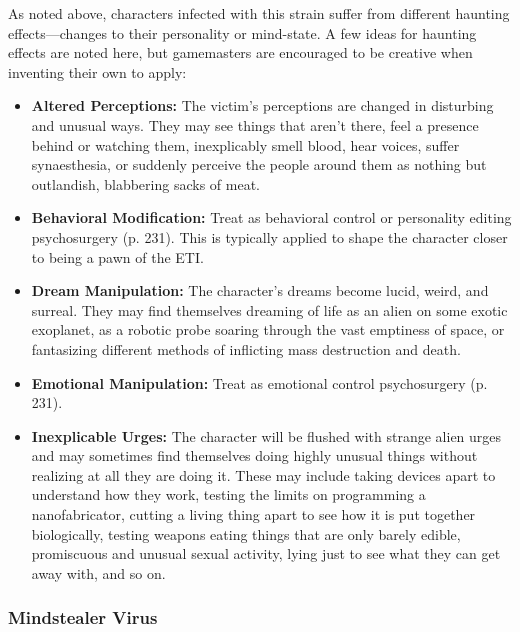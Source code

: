 As noted above, characters infected with this strain suffer from different haunting effects—changes to their personality or mind-state. A few ideas for haunting effects are noted here, but gamemasters are encouraged to be creative when inventing their own to apply: 

\begin{itemize} \item \textbf{Altered Perceptions:} The victim's perceptions are changed in disturbing and unusual ways. They may see things that aren't there, feel a presence behind or watching them, inexplicably smell blood, hear voices, suffer synaesthesia, or suddenly perceive the people around them as nothing but outlandish, blabbering sacks of meat. \item \textbf{Behavioral Modification:} Treat as behavioral control or personality editing psychosurgery (p. 231). This is typically applied to shape the character closer to being a pawn of the ETI. \item \textbf{Dream Manipulation:} The character's dreams become lucid, weird, and surreal. They may find themselves dreaming of life as an alien on some exotic exoplanet, as a robotic probe soaring through the vast emptiness of space, or fantasizing different methods of inflicting mass destruction and death. \item \textbf{Emotional Manipulation:} Treat as emotional control psychosurgery (p. 231). \item \textbf{Inexplicable Urges:} The character will be flushed with strange alien urges and may sometimes find themselves doing highly unusual things without realizing at all they are doing it. These may include taking devices apart to understand how they work, testing the limits on programming a nanofabricator, cutting a living thing apart to see how it is put together biologically, testing weapons eating things that are only barely edible, promiscuous and unusual sexual activity, lying just to see what they can get away with, and so on. \end{itemize} 

\subsubsection{Mindstealer Virus} 


